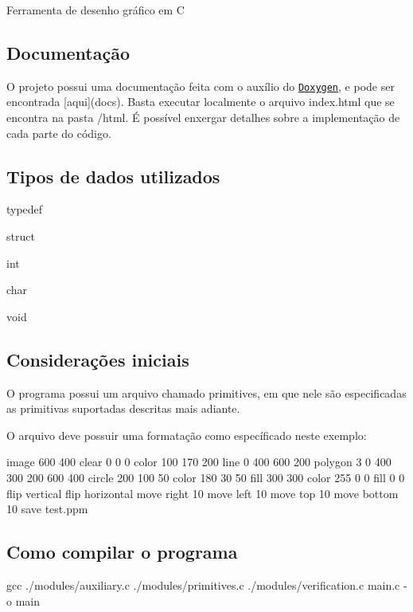 Ferramenta de desenho gráfico em C

\subsection*{Documentação}

O projeto possui uma documentação feita com o auxílio do \href{http://www.doxygen.nl/}{\tt Doxygen}, e pode ser encontrada \mbox{[}aqui\mbox{]}(docs). Basta executar localmente o arquivo {\ttfamily index.\+html} que se encontra na pasta {\ttfamily /html}. É possível enxergar detalhes sobre a implementação de cada parte do código.

\subsection*{Tipos de dados utilizados}


\begin{DoxyItemize}
\item typedef
\item struct
\item int
\item char
\item void
\end{DoxyItemize}

\subsection*{Considerações iniciais}

O programa possui um arquivo chamado {\ttfamily primitives}, em que nele são especificadas as primitivas suportadas descritas mais adiante.

O arquivo deve possuir uma formatação como específicado neste exemplo\+: 
\begin{DoxyCode}
image 600 400
clear 0 0 0
color 100 170 200
line 0 400 600 200
polygon 3 0 400 300 200 600 400
circle 200 100 50
color 180 30 50
fill 300 300
color 255 0 0
fill 0 0
flip vertical
flip horizontal
move right 10
move left 10
move top 10
move bottom 10
save test.ppm
\end{DoxyCode}


\subsection*{Como compilar o programa}


\begin{DoxyCode}
gcc ./modules/auxiliary.c ./modules/primitives.c ./modules/verification.c main.c -o main
\end{DoxyCode}


